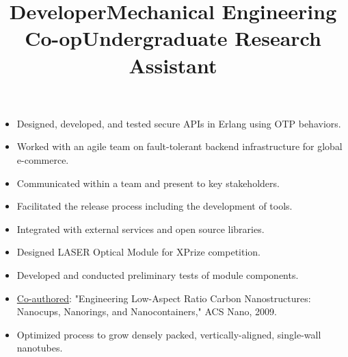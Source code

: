 \documentclass[line]{res}
\begin{document}
\begin{resume}
\title{Developer}
\begin{position}
\noindent
\vspace {-10 pt}
\begin{itemize}
\item Designed, developed, and tested secure APIs in Erlang using OTP behaviors.
\item Worked with an agile team on fault-tolerant backend infrastructure for global e-commerce.
\item Communicated within a team and present to key stakeholders.
\item Facilitated the release process including the development of tools.
\item Integrated with external services and open source libraries.
\end{itemize}
\end{position}

\title{Mechanical Engineering Co-op}
\begin{position}
\noindent
\vspace {-10 pt}
\begin{itemize}
\item Designed LASER Optical Module for XPrize competition.
\item Developed and conducted preliminary tests of module components.
\end{itemize}
\end{position}

\title{Undergraduate Research Assistant}
\begin {position}
\vspace {-10 pt}
\begin{itemize}
\item \underline {Co-authored}: "Engineering Low-Aspect Ratio Carbon Nanostructures: Nanocups, Nanorings, and Nanocontainers," ACS Nano, 2009.
\item Optimized process to grow densely packed, vertically-aligned, single-wall nanotubes.
\end{itemize}
\end{position}


\end{resume}
\end{document}
